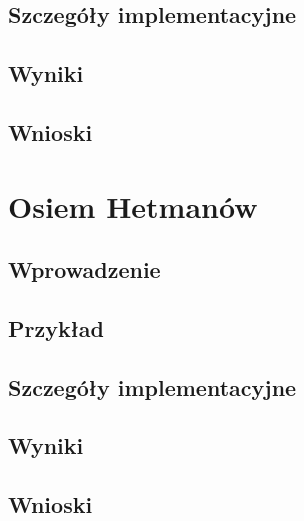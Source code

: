     \subsection{Szczegóły implementacyjne}
    \subsection{Wyniki}
    \subsection{Wnioski}
\section{Osiem Hetmanów}
    \subsection{Wprowadzenie}
    \subsection{Przykład}
    \subsection{Szczegóły implementacyjne}
    \subsection{Wyniki}
    \subsection{Wnioski}